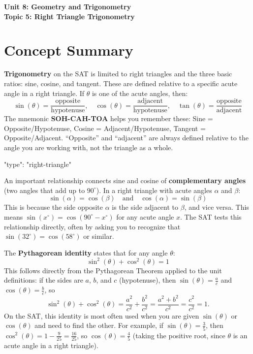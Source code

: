\documentclass[14pt]{extarticle}
\begin{document}
\raggedright
{}

\begin{center}
    \LARGE \textbf{Unit 8: Geometry and Trigonometry} \\[6pt]
    \Large \textbf{Topic 5: Right Triangle Trigonometry}
\end{center}

\vspace{1em}

\section*{Concept Summary}

\textbf{Trigonometry} on the SAT is limited to right triangles and the three basic ratios: sine, cosine, and tangent. These are defined relative to a specific acute angle in a right triangle. If \(\theta\) is one of the acute angles, then:
\[
\sin(\theta) = \frac{\text{opposite}}{\text{hypotenuse}}, \quad \cos(\theta) = \frac{\text{adjacent}}{\text{hypotenuse}}, \quad \tan(\theta) = \frac{\text{opposite}}{\text{adjacent}}
\]
The mnemonic \textbf{SOH-CAH-TOA} helps you remember these: Sine = Opposite/Hypotenuse, Cosine = Adjacent/Hypotenuse, Tangent = Opposite/Adjacent. ``Opposite'' and ``adjacent'' are always defined relative to the angle you are working with, not the triangle as a whole.

\begin{diagramdata}
{
  "type": "right-triangle"
}
\end{diagramdata}

An important relationship connects sine and cosine of \textbf{complementary angles} (two angles that add up to \(90^\circ\)). In a right triangle with acute angles \(\alpha\) and \(\beta\):
\[
\sin(\alpha) = \cos(\beta) \quad \text{and} \quad \cos(\alpha) = \sin(\beta)
\]
This is because the side opposite \(\alpha\) is the side adjacent to \(\beta\), and vice versa. This means \(\sin(x^\circ) = \cos(90^\circ - x^\circ)\) for any acute angle \(x\). The SAT tests this relationship directly, often by asking you to recognize that \(\sin(32^\circ) = \cos(58^\circ)\) or similar.

The \textbf{Pythagorean identity} states that for any angle \(\theta\):
\[
\sin^2(\theta) + \cos^2(\theta) = 1
\]
This follows directly from the Pythagorean Theorem applied to the unit definitions: if the sides are \(a\), \(b\), and \(c\) (hypotenuse), then \(\sin(\theta) = \frac{a}{c}\) and \(\cos(\theta) = \frac{b}{c}\), so
\[
\sin^2(\theta) + \cos^2(\theta) = \frac{a^2}{c^2} + \frac{b^2}{c^2} = \frac{a^2 + b^2}{c^2} = \frac{c^2}{c^2} = 1.
\]
On the SAT, this identity is most often used when you are given \(\sin(\theta)\) or \(\cos(\theta)\) and need to find the other. For example, if \(\sin(\theta) = \frac{3}{5}\), then \(\cos^2(\theta) = 1 - \frac{9}{25} = \frac{16}{25}\), so \(\cos(\theta) = \frac{4}{5}\) (taking the positive root, since \(\theta\) is an acute angle in a right triangle).
\end{document}
